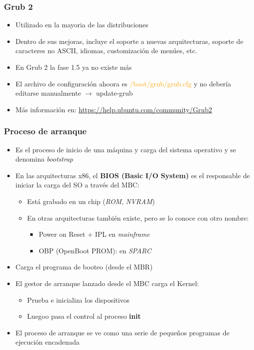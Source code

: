 \begin{frame}
	\frametitle{Grub 2}
	\begin{itemize}
		\item Utilizado en la mayoria de las distribuciones
		\item Dentro de sus mejoras, incluye el soporte a nuevas arquitecturas, soporte de caracteres no ASCII, idiomas, customización de menúes, etc.
		\item En Grub 2 la fase 1.5 ya no existe más
		\item El archivo de configuración ahoora es \textcolor{orange}{/boot/grub/grub.cfg} y no debería editarse manualmente $\rightarrow$ update-grub
		\item Más información en: \url{https://help.ubuntu.com/community/Grub2}
	\end{itemize}
\end{frame}

\begin{frame}
	\frametitle{Proceso de arranque}
	\begin{itemize}
		\item Es el proceso de inicio de una máquina y carga del sistema operativo y se denomina \textit{bootstrap}
		\item En las arquitecturas x86, el \textbf{BIOS (Basic I/O System)} es el responsable de iniciar la carga del SO a través del MBC:
		\begin{itemize}
			\item Está grabado en un chip (\emph{ROM}, \emph{NVRAM})
			\item En otras arquitecturas también existe, pero se lo conoce con otro nombre:
			\begin{itemize}
				\item Power on Reset + IPL en \textit{mainframe}
				\item OBP (OpenBoot PROM): en \textit{SPARC}
			\end{itemize}
		\end{itemize}
		\item Carga el programa de booteo (desde el MBR)
		\item El gestor de arranque lanzado desde el MBC carga el Kernel:
		\begin{itemize}
			\item Prueba e inicializa los dispositivos
			\item Luegoo pasa el control al proceso \textbf{init}
		\end{itemize}
		\item El proceso de arranque se ve como una serie de pequeños programas de ejecución encadenada
	\end{itemize}
\end{frame}

